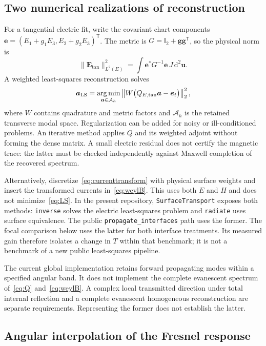 \documentclass[11pt,a4paper]{article}
\newcommand{\vct}[1]{\bm{#1}}
\newcommand{\dd}{\mathrm d}
\newcommand{\Id}{\mathsf I}
\numberwithin{equation}{section}
\begin{document}
\subsection{Two numerical realizations of reconstruction}

For a tangential electric fit, write the covariant chart components
$\vct e=(E_1+g_1E_3,E_2+g_2E_3)^{\mathsf T}$. The metric is
$G=\Id_2+\vct g\vct g^{\mathsf T}$, so the physical norm is
\begin{equation}
 \|\vct E_{\mathrm{tan}}\|_{L^2(\Sigma)}^2
 =\int \vct e^*G^{-1}\vct e\,J\,\dd^2\vct u.
 \label{eq:metric}
\end{equation}
A weighted least-squares reconstruction solves
\begin{equation}
 \vct a_{\rm LS}=\operatorname*{arg\,min}_{\vct a\in\mathcal A_h}
 \left\|W\bigl(Q_{E,\mathrm{tan}}\vct a-\vct e_t\bigr)\right\|_2^2,
 \label{eq:LS}
\end{equation}
where $W$ contains quadrature and metric factors and $\mathcal A_h$ is the
retained transverse modal space. Regularization can be added for noisy or
ill-conditioned problems. An iterative method applies $Q$ and its weighted
adjoint without forming the dense matrix. A small electric residual does not
certify the magnetic trace: the latter must be checked independently against
Maxwell completion of the recovered spectrum.

Alternatively, discretize~\eqref{eq:currenttransform} with physical surface
weights and insert the transformed currents in~\eqref{eq:weylB}. This uses both
$E$ and $H$ and does not minimize~\eqref{eq:LS}. In the present repository,
\texttt{SurfaceTransport} exposes both methods: \texttt{inverse} solves the
electric least-squares problem and \texttt{radiate} uses surface equivalence. The public
\texttt{propagate\_interfaces} path uses the former. The focal comparison below
uses the latter for both interface treatments. Its measured gain therefore
isolates a change in $T$ within that benchmark; it is not a benchmark of a new
public least-squares pipeline.

The current global implementation retains forward propagating modes within a
specified angular band. It does not implement the complete evanescent spectrum
of~\eqref{eq:Q} and~\eqref{eq:weylB}. A complex local transmitted direction
under total internal reflection and a complete evanescent homogeneous
reconstruction are separate requirements. Representing the former does not
establish the latter.

\subsection{Angular interpolation of the Fresnel response}
\label{sec:angularinterp}
\end{document}
